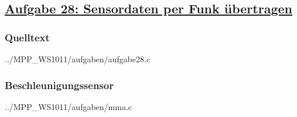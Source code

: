 \subsection*
{\href{http://cst.mi.fu-berlin.de/intern/19606-P-MPP/Aufgaben/041102.html}
{Aufgabe 28: Sensordaten per Funk übertragen}}

\subsubsection*{Quelltext}


{../MPP_WS1011/aufgaben/aufgabe28.c}

\subsubsection*{Beschleunigungssensor}

%


{../MPP_WS1011/aufgaben/mma.c}

